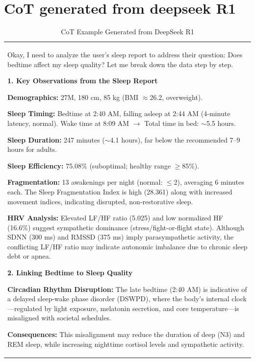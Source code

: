 \documentclass[preprint,12pt]{elsarticle}
\begin{document}
\section{CoT generated from deepseek R1}
\label{app1}
\begin{table}[H]
\renewcommand{\arraystretch}{1} 
\centering
\caption{CoT Example Generated from DeepSeek R1}
\label{tab:CoT_example}
\footnotesize
\setlength{\parskip}{0.2mm}%
\begin{tabular}{@{}p{\textwidth}@{}}
\toprule


Okay, I need to analyze the user’s sleep report to address their question: Does bedtime affect my sleep quality? Let me break down the data step by step.

\textbf{1. Key Observations from the Sleep Report}

\textbf{Demographics:} 27M, 180 cm, 85 kg (BMI $\approx$26.2, overweight).

\textbf{Sleep Timing:} Bedtime at 2:40 AM, falling asleep at 2:44 AM (4-minute latency, normal). Wake time at 8:09 AM $\rightarrow$ Total time in bed: $\sim$5.5 hours.

\textbf{Sleep Duration:} 247 minutes ($\sim$4.1 hours), far below the recommended 7--9 hours for adults.

\textbf{Sleep Efficiency:} 75.08\% (suboptimal; healthy range $\geq$85\%).

\textbf{Fragmentation:} 13 awakenings per night (normal: $\leq$2), averaging 6 minutes each. The Sleep Fragmentation Index is high (28.361) along with increased movement indices, indicating disrupted, non-restorative sleep.

\textbf{HRV Analysis:} Elevated LF/HF ratio (5.025) and low normalized HF (16.6\%) suggest sympathetic dominance (stress/fight-or-flight state). Although SDNN (300 ms) and RMSSD (375 ms) imply parasympathetic activity, the conflicting LF/HF ratio may indicate autonomic imbalance due to chronic sleep debt or apnea.

\textbf{2. Linking Bedtime to Sleep Quality}

\textbf{Circadian Rhythm Disruption:} The late bedtime (2:40 AM) is indicative of a delayed sleep-wake phase disorder (DSWPD), where the body’s internal clock—regulated by light exposure, melatonin secretion, and core temperature—is misaligned with societal schedules.

\textbf{Consequences:} This misalignment may reduce the duration of deep (N3) and REM sleep, while increasing nighttime cortisol levels and sympathetic activity.


\end{tabular}
\end{table}
\end{document}
